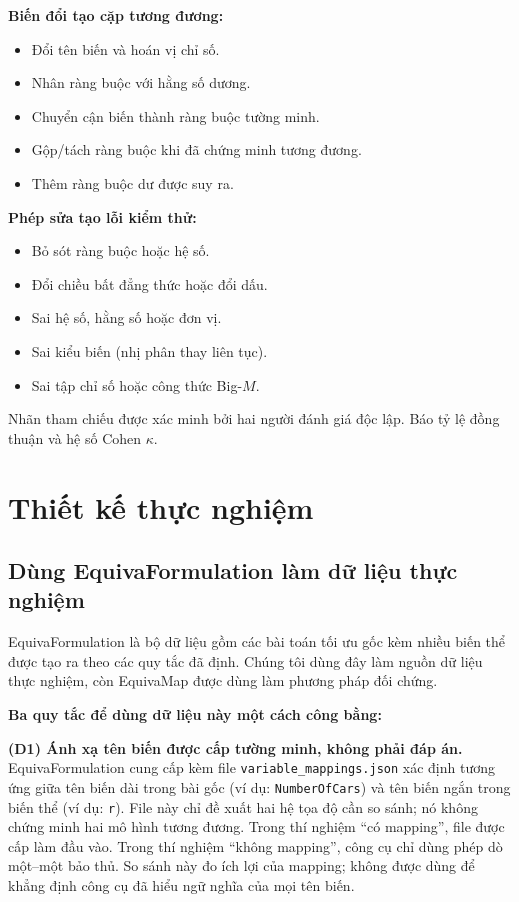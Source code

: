 \documentclass[11pt,a4paper]{article}
\theoremstyle{plain}
\theoremstyle{definition}
\theoremstyle{remark}
\begin{document}
\textbf{Biến đổi tạo cặp tương đương:}
\begin{itemize}
  \item Đổi tên biến và hoán vị chỉ số.
  \item Nhân ràng buộc với hằng số dương.
  \item Chuyển cận biến thành ràng buộc tường minh.
  \item Gộp/tách ràng buộc khi đã chứng minh tương đương.
  \item Thêm ràng buộc dư được suy ra.
\end{itemize}

\textbf{Phép sửa tạo lỗi kiểm thử:}
\begin{itemize}
  \item Bỏ sót ràng buộc hoặc hệ số.
  \item Đổi chiều bất đẳng thức hoặc đổi dấu.
  \item Sai hệ số, hằng số hoặc đơn vị.
  \item Sai kiểu biến (nhị phân thay liên tục).
  \item Sai tập chỉ số hoặc công thức Big-$M$.
\end{itemize}

Nhãn tham chiếu được xác minh bởi hai người đánh giá độc lập.
Báo tỷ lệ đồng thuận và hệ số Cohen $\kappa$.

\section{Thiết kế thực nghiệm}

\subsection{Dùng EquivaFormulation làm dữ liệu thực nghiệm}

EquivaFormulation là bộ dữ liệu gồm các bài toán tối ưu gốc kèm nhiều biến thể
được tạo ra theo các quy tắc đã định. Chúng tôi dùng đây làm nguồn dữ liệu thực nghiệm,
còn EquivaMap \parencite{zhai2025equivamap} được dùng làm phương pháp đối chứng.

\textbf{Ba quy tắc để dùng dữ liệu này một cách công bằng:}

\textbf{(D1) Ánh xạ tên biến được cấp tường minh, không phải đáp án.}
EquivaFormulation cung cấp kèm file \texttt{variable\_mappings.json} xác định tương ứng
giữa tên biến dài trong bài gốc (ví dụ: \texttt{NumberOfCars}) và tên biến ngắn
trong biến thể (ví dụ: \texttt{r}).
File này chỉ đề xuất hai hệ tọa độ cần so sánh; nó không chứng minh hai mô hình
tương đương. Trong thí nghiệm ``có mapping'', file được cấp làm đầu vào. Trong
thí nghiệm ``không mapping'', công cụ chỉ dùng phép dò một--một bảo thủ. So sánh
này đo ích lợi của mapping; không được dùng để khẳng định công cụ đã hiểu ngữ nghĩa
của mọi tên biến.
\end{document}
